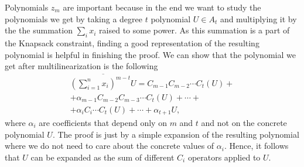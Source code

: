\documentclass[a4paper,twoside,justified]{tufte-handout}
\begin{document}
Polynomials $z_m$ are important because in the end we want to study
the polynomials we get by taking a degree $t$ polynomial $U \in A_t$
and multiplying it by the the summation $\sum_i x_i$ raised to some
power. As this summation is a part of the Knapsack constraint, finding
a good representation of the resulting polynomial is helpful in
finishing the proof. We can show that the polynomial we get after
multilinearization is the following
\begin{multline}
  \overline{\left( \sum_{i = 1}^n x_i \right)^{m - t} U} 
  = C_{m - 1} C_{m - 2} \cdots C_t(U) + \\
  + \alpha_{m - 1} C_{m - 2} C_{m - 3} \cdots C_t(U) 
  + \cdots + \\
  + \alpha_i C_i \cdots C_t(U) 
  + \cdots
  + \alpha_{t + 1} U,
\end{multline}
where $\alpha_i$ are coefficients that depend only on $m$ and $t$ and
not on the concrete polynomial $U$. The proof is just by a simple
expansion of the resulting polynomial where we do not need to care
about the concrete values of $\alpha_i$. Hence, it follows that $U$
can be expanded as the sum of different $C_i$ operators applied to
$U$.




\end{document}
